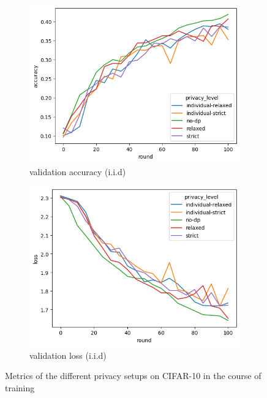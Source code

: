 \begin{figure}
\begin{subfigure}{0.4\textwidth}
		\includegraphics[width=\textwidth]{Bilder/cifar10-accuracy-iid.png}
		\caption{validation accuracy (i.i.d)}
	\end{subfigure}
	\begin{subfigure}{0.4\textwidth}
		\centering
		\includegraphics[width=\textwidth]{Bilder/cifar10-loss-iid.png}
		\caption{validation loss (i.i.d)}
	\end{subfigure}
	\label{fig:fed-cifar10-results}
	\caption{Metrics of the different privacy setups on CIFAR-10 in the course of training}
\end{figure}

